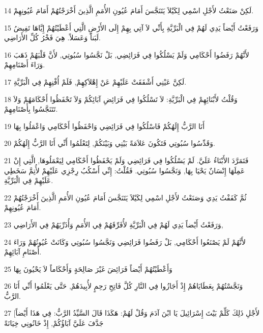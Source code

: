 \par 14 لَكِنْ صَنَعْتُ لأَجْلِ اسْمِي لِكَيْلاَ يَتَنَجَّسَ أَمَامَ عُيُونِ الأُمَمِ الَّذِينَ أَخْرَجْتُهُمْ أَمَامَ عُيُونِهِمْ.
\par 15 وَرَفَعْتُ أَيْضاً يَدِي لَهُمْ فِي الْبَرِّيَّةِ بِأَنِّي لاَ آتِي بِهِمْ إِلَى الأَرْضِ الَّتِي أَعْطَيْتُهُمْ إِيَّاهَا تَفِيضُ لَبَناً وَعَسَلاً. هِيَ فَخْرُ كُلِّ الأَرَاضِي.
\par 16 لأَنَّهُمْ رَفَضُوا أَحْكَامِي وَلَمْ يَسْلُكُوا فِي فَرَائِضِي, بَلْ نَجَّسُوا سُبُوتِي, لأَنَّ قَلْبَهُمْ ذَهَبَ وَرَاءَ أَصْنَامِهِمْ.
\par 17 لَكِنَّ عَيْنِي أَشْفَقَتْ عَلَيْهِمْ عَنْ إِهْلاَكِهِمْ, فَلَمْ أُفْنِهِمْ فِي الْبَرِّيَّةِ.
\par 18 وَقُلْتُ لأَبْنَائِهِمْ فِي الْبَرِّيَّةِ: لاَ تَسْلُكُوا فِي فَرَائِضِ آبَائِكُمْ وَلاَ تَحْفَظُوا أَحْكَامَهُمْ وَلاَ تَتَنَجَّسُوا بِأَصْنَامِهِمْ.
\par 19 أَنَا الرَّبُّ إِلَهُكُمْ فَاسْلُكُوا فِي فَرَائِضِي وَاحْفَظُوا أَحْكَامِي وَاعْمَلُوا بِهَا
\par 20 وَقَدِّسُوا سُبُوتِي فَتَكُونَ عَلاَمَةً بَيْنِي وَبَيْنَكُمْ, لِتَعْلَمُوا أَنِّي أَنَا الرَّبُّ إِلَهُكُمْ.
\par 21 فَتَمَرَّدَ الأَبْنَاءُ عَلَيَّ. لَمْ يَسْلُكُوا فِي فَرَائِضِي وَلَمْ يَحْفَظُوا أَحْكَامِي لِيَعْمَلُوهَا, الَّتِي إِنْ عَمِلَهَا إِنْسَانٌ يَحْيَا بِهَا, وَنَجَّسُوا سُبُوتِي. فَقُلْتُ: إِنِّي أَسْكُبُ رِجْزِي عَلَيْهِمْ لأُتِمَّ سَخَطِي عَلَيْهِمْ فِي الْبَرِّيَّةِ.
\par 22 ثُمَّ كَفَفْتُ يَدِي وَصَنَعْتُ لأَجْلِ اسْمِي لِكَيْلاَ يَتَنَجَّسَ أَمَامَ عُيُونِ الأُمَمِ الَّذِينَ أَخْرَجْتُهُمْ أَمَامَ عُيُونِهِمْ.
\par 23 وَرَفَعْتُ أَيْضاً يَدِي لَهُمْ فِي الْبَرِّيَّةِ لأُفَرِّقَهُمْ فِي الأُمَمِ وَأُذَرِّيَهُمْ فِي الأَرَاضِي,
\par 24 لأَنَّهُمْ لَمْ يَصْنَعُوا أَحْكَامِي, بَلْ رَفَضُوا فَرَائِضِي وَنَجَّسُوا سُبُوتِي وَكَانَتْ عُيُونُهُمْ وَرَاءَ أَصْنَامِ آبَائِهِمْ.
\par 25 وَأَعْطَيْتُهُمْ أَيْضاً فَرَائِضَ غَيْرَ صَالِحَةٍ وَأَحْكَاماً لاَ يَحْيُونَ بِهَا
\par 26 وَنَجَّسْتُهُمْ بِعَطَايَاهُمْ إِذْ أَجَازُوا فِي النَّارِ كُلَّ فَاتِحِ رَحِمٍ لأُبِيدَهُمْ, حَتَّى يَعْلَمُوا أَنِّي أَنَا الرَّبُّ.
\par 27 [لأَجْلِ ذَلِكَ كَلِّمْ بَيْتَ إِسْرَائِيلَ يَا ابْنَ آدَمَ وَقُلْ لَهُمْ: هَكَذَا قَالَ السَّيِّدُ الرَّبُّ: فِي هَذَا أَيْضاً جَدَّفَ عَلَيَّ آبَاؤُكُمْ, إِذْ خَانُونِي خِيَانَةً
